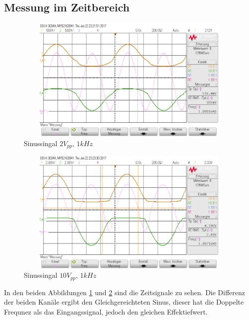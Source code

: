 \subsection{Messung im Zeitbereich}
\begin{figure}[H]
 \begin{center}
  \includegraphics[height=6cm,width=12cm]{OsziBilder/bsp4_sin_time_2Vpp_UeUa.png}
 \end{center}
 \caption{Sinussingal $2V_{pp}$, $1kHz$}\label{bsp4_time2V}
\end{figure}
\noindent

\begin{figure}[H]
 \begin{center}
  \includegraphics[height=6cm,width=12cm]{OsziBilder/bsp4_time_10Vpp_UeUa.png}
 \end{center}
 \caption{Sinussingal $10V_{pp}$, $1kHz$}\label{bsp4_time10V}
\end{figure}
\noindent
In den beiden Abbildungen \ref{bsp4_time2V} und \ref{bsp4_time10V} sind die Zeitsignale zu sehen. Die Differenz der beiden Kan\"ale ergibt den Gleichgereichteten Sinus, dieser hat die Doppelte Frequnez als das Eingangssignal, jedoch den gleichen Effektiefwert.

